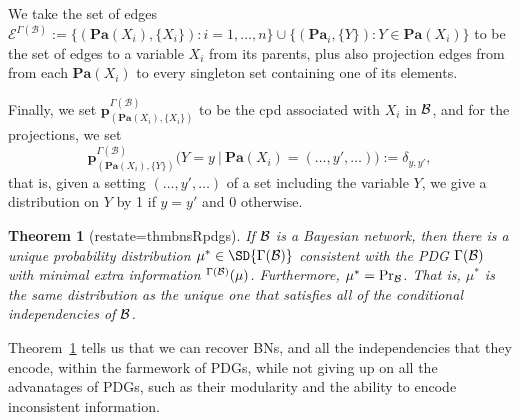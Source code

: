 \documentclass{article}
\theoremstyle{plain}
\newtheorem{theorem}{Theorem}[section]
\theoremstyle{definition}
\theoremstyle{remark}
\let\H\relax
\DeclareMathOperator{\H}{\mathrm{H}} %
\newcommand\mat[1]{\mathbf{#1}}
\newcommand{\Ed}{\mathcal E}
\newcommand\Pa{\mathbf{Pa}}
\newcommand\PDGof{\Gamma}
\numberwithin{equation}{section}
\begin{document}
\begin{defn}
We take the set of edges $\Ed^{\PDGof(\mathcal B)} := \{ (\Pa(X_i), \{X_i\}) :
                i = 1, \ldots, n \} \cup \{ (\Pa_i, \{Y\}) : Y \in
                \Pa(X_i)\}$ to be the set of edges to a variable $X_i$
                from its parents, plus also projection edges from
               from each $\Pa(X_i)$ to every singleton set containing one of its elements.

		Finally, we set $\mat p^{\PDGof(\mathcal B)}_{(\Pa(X_i), \{X_i\})}$ to be the cpd associated with $X_i$ in $\cal B$, and for the projections, we set 
		\[ \mat p^{\PDGof(\mathcal B)}_{(\Pa(X_i), \{Y\})}\Big(Y = y \ \Big|\ \Pa(X_i) = (\ldots, y', \ldots)\Big) := \delta_{y,y'}, \]
		that is, given a setting $(\ldots, y', \ldots)$ of a set including the variable $Y$, we give a distribution on $Y$ by  1 if $y = y'$ and 0 otherwise.
	\end{defn}
	
	
	\begin{theorem}[restate=thmbnsRpdgs]\label{thm:bns-are-pdgs}
		If $\cal B$ is a Bayesian network, then there is a
                unique probability distribution $\mu^* \in
                \SD{\PDGof(\mathcal B)}$ consistent with the PDG
                $\PDGof(\cal B)$ with minimal extra information
                $\H^{\PDGof(\mathcal B)}(\mu)$. Furthermore, $\mu^* =
                \Pr_{\cal B}$. That is, $\mu^*$ is the same
                distribution as the unique one that satisfies all of
                the conditional independencies of $\cal B$.	 
	\end{theorem}

Theorem~\ref{thm:bns-are-pdgs} tells us that we can recover BNs, and
all the independencies that they encode, within the farmework of PDGs,
while not giving up on all the advanatages of PDGs, such as their
modularity and the ability to encode inconsistent information.
\end{document}
